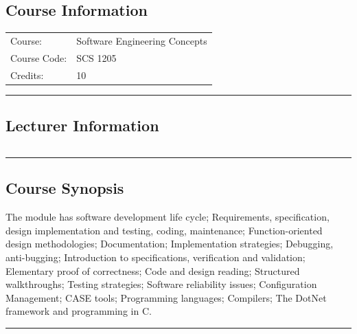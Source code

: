
\subsection*{Course Information}
\vspace{0ex}%
\noindent\parbox{0.5\textwidth}{%
    \noindent\begin{tabular}{@{}ll}
                 \textsf{Course:}          & 	Software Engineering Concepts    \\
                 \textsf{Course Code:}         & 	SCS 1205    \\
                 \textsf{Credits:}    & 	10
    \end{tabular}}
\vspace{2ex}\hrule\vspace{2ex}

\subsection*{Lecturer Information}
\noindent\parbox{0.5\textwidth}{%
    \noindent\begin{tabular}{@{}ll}
                 
    \end{tabular}}
\vspace{2ex}\hrule\vspace{2ex}


\subsection*{Course Synopsis}
The module has software development life cycle; Requirements, specification, design implementation
and testing, coding, maintenance; Function-oriented design methodologies; Documentation;
Implementation strategies; Debugging, anti-bugging; Introduction to specifications, verification and
validation; Elementary proof of correctness; Code and design reading; Structured walkthroughs;
Testing strategies; Software reliability issues; Configuration Management; CASE tools; Programming
languages; Compilers; The DotNet framework and programming in C.
\vspace{2ex} \hrule\vspace{2ex}

